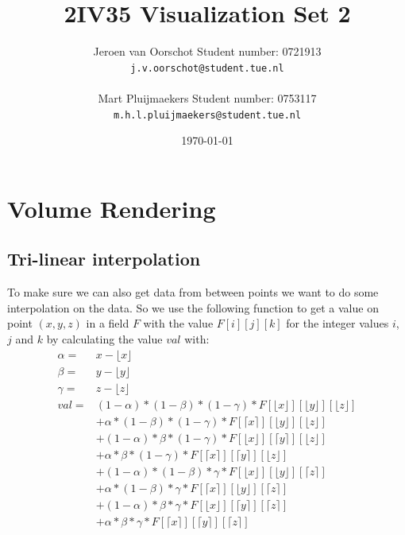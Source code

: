 \documentclass[a4paper,twoside,11pt]{article}
\title{\vspace{-\baselineskip}\sffamily\bfseries 2IV35 Visualization Set 2}
\author{Jeroen van Oorschot \qquad Student number: 0721913 \\{\tt j.v.oorschot@student.tue.nl}\\ \\Mart Pluijmaekers \qquad Student number: 0753117 \\{\tt m.h.l.pluijmaekers@student.tue.nl}}
\date{\today}
\begin{document}
\maketitle

\pagebreak
\tableofcontents
\newpage
\section{Volume Rendering}
\subsection{Tri-linear interpolation}
To make sure we can also get data from between points we want to do some interpolation on the data. So we use the following function to get a value on point $(x,y,z)$ in a field $F$ with the value $F[i][j][k]$ for the integer values $i$, $j$ and $k$ by calculating the value $val$ with:
\begin{eqnarray*}
\alpha =& x-\lfloor x \rfloor\\
\beta =& y-\lfloor y \rfloor\\
\gamma =& z-\lfloor z \rfloor\\
val =& (1 - \alpha) * (1 - \beta) * (1 - \gamma ) * F[\lfloor x \rfloor][\lfloor y \rfloor][\lfloor z \rfloor] \\
&+ \alpha * (1 - \beta) * (1 - \gamma ) * F[\lceil x \rceil][\lfloor y \rfloor][\lfloor z \rfloor]\\
                    &+ (1 - \alpha) * \beta * (1 - \gamma ) * F[\lfloor x \rfloor][\lceil y \rceil][\lfloor z \rfloor] \\
                    &+ \alpha * \beta * (1 - \gamma ) * F[\lceil x \rceil][\lceil y \rceil][\lfloor z \rfloor]\\
                    &+ (1 - \alpha) * (1 - \beta) * \gamma  * F[\lfloor x \rfloor][\lfloor y \rfloor][\lceil z \rceil] \\
                    &+ \alpha * (1 - \beta) * \gamma  * F[\lceil x \rceil][\lfloor y \rfloor][\lceil z \rceil]\\
                    &+ (1 - \alpha) * \beta * \gamma  * F[\lfloor x \rfloor][\lceil y \rceil][\lceil z \rceil] \\
                    &+ \alpha * \beta * \gamma  * F[\lceil x \rceil][\lceil y \rceil][\lceil z \rceil]
\end{eqnarray*}
\end{document}
